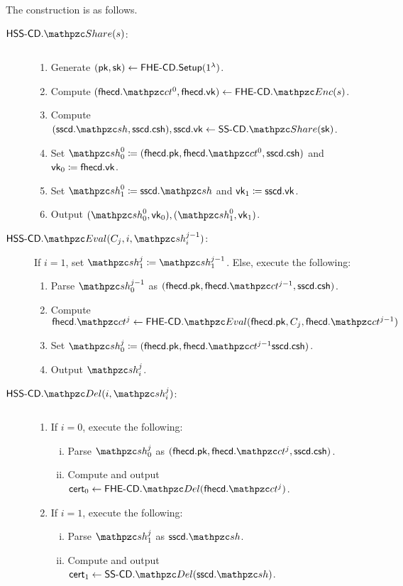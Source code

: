 The construction is as follows.

\begin{description}

\item[$\HSScd.\Sh(s)$:] $ $
\begin{enumerate}
    \item Generate $(\mathsf{pk}, \mathsf{sk}) \leftarrow \mathsf{FHE\textrm{-}CD}.\mathsf{Setup}(1^\lambda)$.
    \item Compute $(\fhecd.\qct^0, \fhecd.\vk) \leftarrow
        \FHEcd.\qEnc(s)$.
    \item Compute $(\sscd.\qsh, \sscd.\csh), \sscd.\vk
    \leftarrow \SScd.\Sh(\sk)$.
\item Set $\qsh_0^0 \seteq (\fhecd.\pk, \fhecd.\qct^0, \sscd.\csh)$
and $\mathsf{vk}_0 \coloneqq \mathsf{fhe}\mathsf{cd}.\mathsf{vk}$.
\item Set $\qsh_1^0 \seteq \sscd.\qsh$ and $\mathsf{vk}_1 \coloneqq \mathsf{ss}\mathsf{cd}.\mathsf{vk}$.
\item Output $(\qsh_0^0, \vk_0), (\qsh_1^0, \vk_1)$.
\end{enumerate}

\item[$\HSScd.\Ev(C_j, i, \qsh_i^{j-1})$:] If $i = 1$, set
$\qsh_1^{j} \seteq \qsh_1^{j-1}$. Else, execute the following:
\begin{enumerate}
\item Parse $\qsh_{0}^{j-1}$ as $(\fhecd.\pk, \fhecd.\qct^{j-1},
\sscd.\csh)$.
\item Compute $\fhecd.\qct^j \leftarrow \FHEcd.\Ev(\fhecd.\pk, C_j,
\fhecd.\qct^{j-1})$
\item Set $\qsh_0^{j} \seteq (\fhecd.\pk, \fhecd.\qct^{j-1}
\sscd.\csh)$.
\item Output $\qsh_i^j$.
\end{enumerate}

\item[$\HSScd.\Del(i, \qsh_i^j)$:] $ $
\begin{enumerate}
\item If $i = 0$, execute the following:
\begin{enumerate}[(i)]
\item Parse $\qsh_0^j$ as $(\fhecd.\pk, \fhecd.\qct^j, \sscd.\csh)$.
\item Compute and output $\cert_0 \leftarrow
\FHEcd.\Del(\fhecd.\qct^j)$.
\end{enumerate}
\item If $i = 1$, execute the following:
\begin{enumerate}[(i)]
\item Parse $\qsh_1^j$ as $\sscd.\qsh$.
\item Compute and output $\cert_1 \leftarrow
\SScd.\Del(\sscd.\qsh)$.
\end{enumerate}
\end{enumerate}


\end{description}
